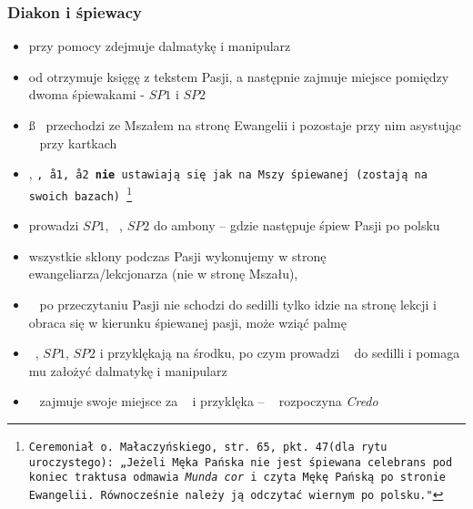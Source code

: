 \subsubsection*{\textbf{Diakon i śpiewacy}}
\begin{itemize}
      \item przy pomocy  zdejmuje dalmatykę i manipularz
      \item od  otrzymuje księgę z tekstem Pasji, a następnie zajmuje
            miejsce pomiędzy dwoma śpiewakami - $SP1$ i $SP2$
      \item \ss~ przechodzi ze Mszałem na stronę Ewangelii i pozostaje przy nim
            asystując \ii~ przy kartkach
      \item {}, \tt, \aa1, \aa2 \textbf{nie} ustawiają się jak na Mszy
            śpiewanej (zostają na swoich bazach) \footnote{Ceremoniał o.
                  Małaczyńskiego, str. 65, pkt. 47(dla rytu uroczystego): „Jeżeli Męka
                  Pańska nie jest śpiewana celebrans pod koniec traktusa odmawia
                  \textit{Munda cor} i czyta Mękę Pańską po stronie Ewangelii.
                  Równocześnie należy ją odczytać wiernym  po polsku."}
      \item {} prowadzi $SP1$, \dd~, $SP2$ do ambony – gdzie następuje śpiew
            Pasji po polsku
      \item wszystkie skłony podczas Pasji wykonujemy w stronę
            ewangeliarza/lekcjonarza (nie w stronę Mszału),
      \item \ii~ po przeczytaniu Pasji nie schodzi do sedilli tylko idzie na
            stronę lekcji i obraca się w kierunku śpiewanej pasji, może wziąć
            palmę 
      \item \dd~, $SP1$, $SP2$ i  przyklękają na środku, po czym 
            prowadzi \dd~ do sedilli i pomaga mu założyć dalmatykę i manipularz
      \item \dd~ zajmuje swoje miejsce za \ii~ i przyklęka --
            \ii~ rozpoczyna \textit{Credo}
\end{itemize}